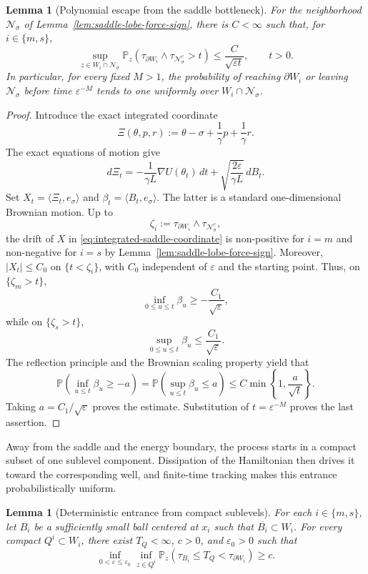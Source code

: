 \documentclass[11pt]{article}
\numberwithin{equation}{section}
\theoremstyle{plain}
\newtheorem{lemma}[theorem]{Lemma}
\theoremstyle{definition}
\theoremstyle{remark}
\newcommand{\eps}{\varepsilon}
\newcommand{\Pbb}{\mathbb P}
\begin{document}
\begin{lemma}[Polynomial escape from the saddle bottleneck]
\label{lem:original-saddle-bottleneck-escape}
For the neighborhood $\mathcal N_\sigma$ of
Lemma~\ref{lem:saddle-lobe-force-sign}, there is $C<\infty$
such that, for $i\in\{m,s\}$,
\[
 \sup_{z\in W_i\cap\mathcal N_\sigma}
 \Pbb_z\!\left(
 \tau_{\partial W_i}\wedge\tau_{\mathcal N_\sigma^c}>t
 \right)
 \le \frac{C}{\sqrt{\eps t}},
 \qquad t>0.
\]
In particular, for every fixed $M>1$, the probability of reaching
$\partial W_i$ or leaving $\mathcal N_\sigma$ before time $\eps^{-M}$ tends to
one uniformly over $W_i\cap\mathcal N_\sigma$.
\end{lemma}

\begin{proof}
Introduce the exact integrated coordinate
\[
 \Xi(\theta,p,r)
 :=\theta-\sigma+\frac{1}{\gamma}p+\frac1\gamma r .
\]
The exact equations of motion give
\begin{equation}
\label{eq:integrated-saddle-coordinate}
 d\Xi_t
 =-\frac{1}{\gamma L}\nabla U(\theta_t)\,dt
   +\sqrt{\frac{2\eps}{\gamma L}}\,dB_t .
\end{equation}
Set $X_t=\langle\Xi_t,e_\sigma\rangle$ and
$\beta_t=\langle B_t,e_\sigma\rangle$.  The latter is a standard
one-dimensional Brownian motion.  Up to
\[
 \zeta_i:=\tau_{\partial W_i}\wedge\tau_{\mathcal N_\sigma^c},
\]
the drift of $X$ in \eqref{eq:integrated-saddle-coordinate} is non-positive
for $i=m$ and non-negative for $i=s$ by
Lemma~\ref{lem:saddle-lobe-force-sign}.  Moreover, $|X_t|\le C_0$ on
$\{t<\zeta_i\}$, with $C_0$ independent of $\eps$ and the starting point.
Thus, on $\{\zeta_m>t\}$,
\[
 \inf_{0\le u\le t}\beta_u
 \ge-\frac{C_1}{\sqrt\eps},
\]
while on $\{\zeta_s>t\}$,
\[
 \sup_{0\le u\le t}\beta_u
 \le\frac{C_1}{\sqrt\eps}.
\]
The reflection principle and the Brownian scaling property yield that
\[
 \Pbb\!\left(\inf_{u\le t}\beta_u\ge-a\right)
 =\Pbb\!\left(\sup_{u\le t}\beta_u\le a\right)
 \le C\min\!\left\{1,\frac{a}{\sqrt t}\right\}.
\]
Taking $a=C_1/\sqrt\eps$ proves the estimate.  Substitution of
$t=\eps^{-M}$ proves the last assertion.
\end{proof}



Away from the saddle and the energy boundary, the process starts in a compact
subset of one sublevel component.  Dissipation of the Hamiltonian then drives
it toward the corresponding well, and finite-time tracking makes this
entrance probabilistically uniform.

\begin{lemma}[Deterministic entrance from compact sublevels]
\label{lem:original-compact-entrance-well-ball}
For each $i\in\{m,s\}$, let $B_i$ be a sufficiently small ball centered at
$x_i$ such that $\overline{B_i}\subset W_i$.  For every compact
$Q^i\subset W_i$, there exist
$T_Q<\infty$, $c>0$, and $\eps_0>0$ such that
\[
\inf_{0<\eps\le\eps_0}\inf_{z\in Q^i}
\Pbb_z\!\left(\tau_{B_i}\le T_Q<\tau_{\partial W_i}\right)\ge c.
\]
\end{lemma}
\end{document}
